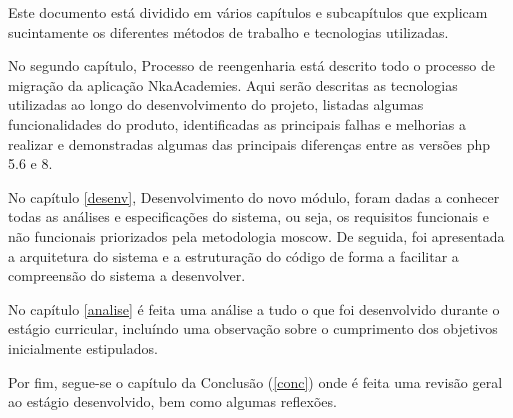 Este documento está dividido em vários capítulos e subcapítulos que explicam sucintamente os diferentes métodos de trabalho e tecnologias utilizadas.

No segundo capítulo, Processo de reengenharia está descrito todo o processo de migração da aplicação NkaAcademies. Aqui serão descritas as tecnologias utilizadas ao longo do desenvolvimento do projeto, listadas algumas funcionalidades do produto, identificadas as principais falhas e melhorias a realizar e demonstradas algumas das principais diferenças entre as versões \acrshort{php} 5.6 e 8.

No capítulo \ref{desenv}, Desenvolvimento do novo módulo, foram dadas a conhecer todas as análises e especificações do sistema, ou seja, os requisitos funcionais e não funcionais priorizados pela metodologia \acrshort{moscow}. De seguida, foi apresentada a arquitetura do sistema e a estruturação do código de forma a facilitar a compreensão do sistema a desenvolver.

No capítulo \ref{analise} é feita uma análise a tudo o que foi desenvolvido durante o estágio curricular, incluíndo uma observação sobre o cumprimento dos objetivos inicialmente estipulados.

Por fim, segue-se o capítulo da Conclusão (\ref{conc}) onde é feita uma revisão geral ao estágio desenvolvido, bem como algumas reflexões.
